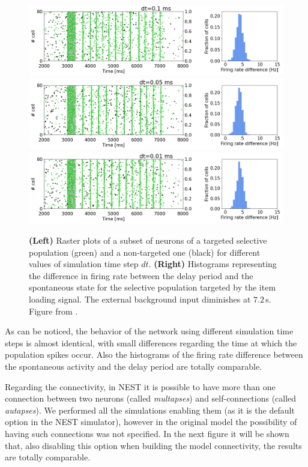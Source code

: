 \documentclass[a4paper, 12pt, twoside, openright]{book}
\begin{document}
\begin{figure}[h]
    \centering
    \includegraphics[width=0.8\columnwidth]{figures/fig2_0.1ms.png}
    \includegraphics[width=0.8\columnwidth]{figures/fig2_0.05ms.png}
    \includegraphics[width=0.8\columnwidth]{figures/fig2_0.01ms.png}
    \caption{\textbf{(Left)} Raster plots of a subset of neurons of a targeted selective population (green) and a non-targeted one (black) for different values of simulation time step $dt$. \textbf{(Right)} Histograms representing the difference in firing rate between the delay period and the spontaneous state for the selective population targeted by the item loading signal. The external background input diminishes at $7.2$\,s. Figure from \cite{Tiddia2022_WM}.}
    \label{fig:figure2b_different_dt}
\end{figure}

As can be noticed, the behavior of the network using different simulation time steps is almost identical, with small differences regarding the time at which the population spikes occur. Also the histograms of the firing rate difference between the spontaneous activity and the delay period are totally comparable.

Regarding the connectivity, in NEST it is possible to have more than one connection between two neurons (called \textit{multapses}) and self-connections (called \textit{autapses}). We performed all the simulations enabling them (as it is the default option in the NEST simulator), however in the original model the possibility of having such connections was not specified. In the next figure it will be shown that, also disabling this option when building the model connectivity, the results are totally comparable.
\end{document}
